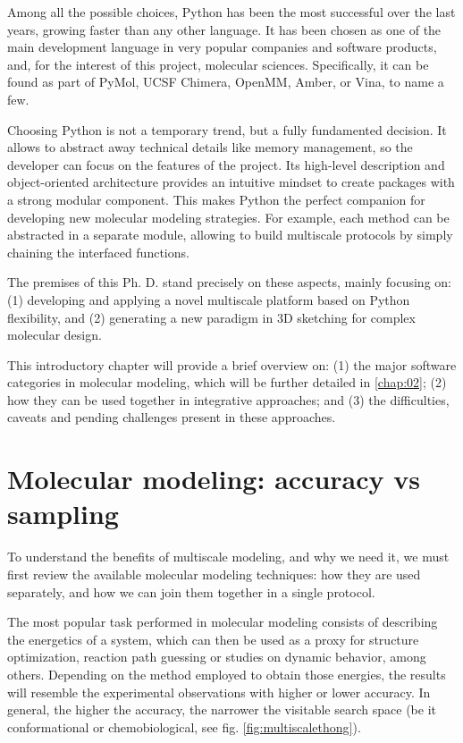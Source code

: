 Among all the possible choices, Python has been the most successful over the last years, growing faster than any other language.\cite{stackoverflowpythongrowth} It has been chosen as one of the main development language in very popular companies and software products,\cite{pythonsuccess,googlepython,facebookpython,netflixpython} and, for the interest of this project, molecular sciences. Specifically, it can be found as part of PyMol,\cite{delano2002pymol} UCSF Chimera,\cite{chimera} OpenMM,\cite{openmm} Amber,\cite{amber} or Vina,\cite{trott2010autodock} to name a few.

Choosing Python is not a temporary trend, but a fully fundamented decision. It allows to abstract away technical details like memory management, so the developer can focus on the features of the project. Its high-level description and object-oriented architecture provides an intuitive mindset to create packages with a strong modular component. This makes Python the perfect companion for developing new molecular modeling strategies. For example, each method can be abstracted in a separate module, allowing to build multiscale protocols by simply chaining the interfaced functions.

The premises of this Ph. D. stand precisely on these aspects, mainly focusing on: (1) developing and applying a novel multiscale platform based on Python flexibility, and (2) generating a new paradigm in 3D sketching for complex molecular design.

This introductory chapter will provide a brief overview on: (1) the major software categories in molecular modeling, which will be further detailed in \autoref{chap:02}; (2) how they can be used together in integrative approaches; and (3) the difficulties, caveats and pending challenges present in these approaches.

\section{Molecular modeling: accuracy vs sampling}

To understand the benefits of multiscale modeling, and why we need it, we must first review the available molecular modeling techniques: how they are used separately, and how we can join them together in a single protocol.

The most popular task performed in molecular modeling consists of describing the energetics of a system, which can then be used as a proxy for structure optimization, reaction path guessing or studies on dynamic behavior, among others. Depending on the method employed to obtain those energies, the results will resemble the experimental observations with higher or lower accuracy. In general, the higher the accuracy, the narrower the visitable search space (be it conformational or chemobiological, see fig. \ref{fig:multiscalethong}).

